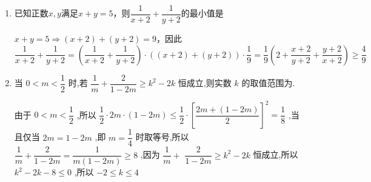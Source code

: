 \begin{enumerate}
    \item 已知正数$x, y$满足$x+y = 5$，则$\dfrac{1}{x+2} + \dfrac{1}{y+2}$的最小值是 
    \begin{jieda}
        $x+y=5 \Longrightarrow (x+2)+(y+2) = 9$，因此$\dfrac{1}{x+2}+\dfrac{1}{y+2} = \left(\dfrac{1}{x+2}+\dfrac{1}{y+2}\right) \cdot ((x+2)+(y+2)) \cdot \dfrac{1}{9} = \dfrac{1}{9} \left(2 + \dfrac{x+2}{y+2} + \dfrac{y+2}{x+2}\right) \geq \dfrac{4}{9}$
    \end{jieda}

    \item 当 $0 < m < \dfrac{1}{2}$ 时,若 $\dfrac{1}{m} + \dfrac{2}{1 - {2m}} \geq  {k}^{2} - {2k}$ 恒成立,则实数 $k$ 的取值范围为\blkda[4]{$[-2,4]$}.
    \begin{jieda}
        由于 $0 < m < \dfrac{1}{2}$ ,所以 $\dfrac{1}{2} \cdot  {2m} \cdot  \left( {1 - {2m}}\right)  \leq  \dfrac{1}{2} \cdot  {\left\lbrack  \dfrac{{2m} + \left( {1 - {2m}}\right) }{2}\right\rbrack  }^{2} = \dfrac{1}{8}$ ,当且仅当 ${2m} = 1 - {2m}$ ,即 $m = \dfrac{1}{4}$ 时取等号,所以 $\dfrac{1}{m} + \dfrac{2}{1 - {2m}} = \dfrac{1}{m\left( {1 - {2m}}\right) } \geq  8$ ,因为 $\dfrac{1}{m} +$  $\dfrac{2}{1 - {2m}} \geq  {k}^{2} - {2k}$ 恒成立,所以 ${k}^{2} - {2k} - 8 \leq  0$ ,所以 $- 2 \leq  k \leq  4$
    \end{jieda}
\end{enumerate}
